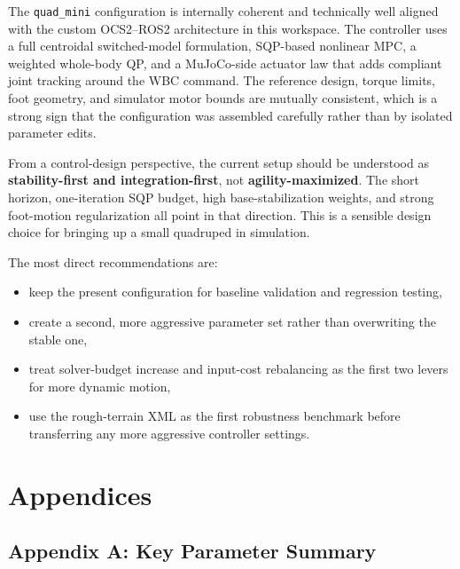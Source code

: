 \documentclass[11pt,a4paper]{article}
\newcommand{\code}[1]{\texttt{#1}}
\begin{document}
The \code{quad\_mini} configuration is internally coherent and technically well aligned with the custom OCS2--ROS2 architecture in this
workspace. The controller uses a full centroidal switched-model formulation, SQP-based nonlinear MPC, a weighted whole-body QP, and a
MuJoCo-side actuator law that adds compliant joint tracking around the WBC command. The reference design, torque limits, foot geometry,
and simulator motor bounds are mutually consistent, which is a strong sign that the configuration was assembled carefully rather than by
isolated parameter edits.

From a control-design perspective, the current setup should be understood as \textbf{stability-first and integration-first}, not
\textbf{agility-maximized}. The short horizon, one-iteration SQP budget, high base-stabilization weights, and strong foot-motion
regularization all point in that direction. This is a sensible design choice for bringing up a small quadruped in simulation.

The most direct recommendations are:
\begin{itemize}[leftmargin=*]
  \item keep the present configuration for baseline validation and regression testing,
  \item create a second, more aggressive parameter set rather than overwriting the stable one,
  \item treat solver-budget increase and input-cost rebalancing as the first two levers for more dynamic motion,
  \item use the rough-terrain XML as the first robustness benchmark before transferring any more aggressive controller settings.
\end{itemize}

\section{Appendices}

\subsection{Appendix A: Key Parameter Summary}
\end{document}
